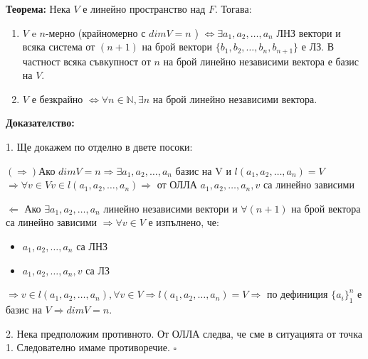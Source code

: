 \documentclass[fleqn,12pt]{article}
\begin{document}
\begin{flushleft}
    \vspace{5mm}
    
    \textbf{Теорема:} Нека $V$ е линейно пространство над $F$. Тогава:
    \begin{enumerate}
        \item $V$ e $n$-мерно (крайномерно с $dimV = n$ ) $\iff$$ \exists a_1, a_2, \dots, a_n $ ЛНЗ вектори и всяка система от $(n+1)$ на брой вектори $\{b_1, b_2, \dots, b_n, b_{n+1}\}$ е ЛЗ. В частност всяка съвкупност от $n$ на брой линейно независими вектора е базис на $V$.
        \item $V$ е безкрайно $ \iff  \forall n \in \mathbb{N}, \exists n $ на брой линейно независими вектора.
    \end{enumerate}

    \vspace{5mm}
    
        \textbf{Доказателство:}

        1. Ще докажем по отделно в двете посоки:
            
        \vspace{5mm}
        
        $(\Rightarrow) $Ако $dimV = n \Rightarrow \exists a_1, a_2, \dots, a_n $ базис на V и $l(a_1, a_2, \dots, a_n) = V$ $\Rightarrow \forall v \in V v \in l(a_1, a_2, \dots, a_n) \Rightarrow $ от ОЛЛА $ a_1, a_2, \dots, a_n, v $ са линейно зависими 

        \vspace{5mm}
    
        $\Leftarrow $ Ако $ \exists a_1, a_2, \dots, a_n $ линейно независими вектори и $ \forall (n + 1) $ на брой вектора са линейно зависими $\Rightarrow \forall v \in V $ е изпълнено, че:
        \begin{itemize}
            \item $a_1, a_2, \dots, a_n $ са ЛНЗ
            \item $a_1, a_2, \dots, a_n, v $ са  ЛЗ
        \end{itemize}
            
        $\Rightarrow v \in l(a_1, a_2, \dots, a_n), \forall v \in V \Rightarrow l(a_1, a_2, \dots, a_n) = V \Rightarrow $ по дефиниция $ \{a_i\}_1^n $ е базис на $V \Rightarrow dimV = n$. 

        \vspace{5mm}
    
        2. Нека предположим противното. От ОЛЛА следва, че сме в ситуацията от точка 1. Следователно имаме противоречие. $\square$
        

\end{flushleft}
\end{document}
